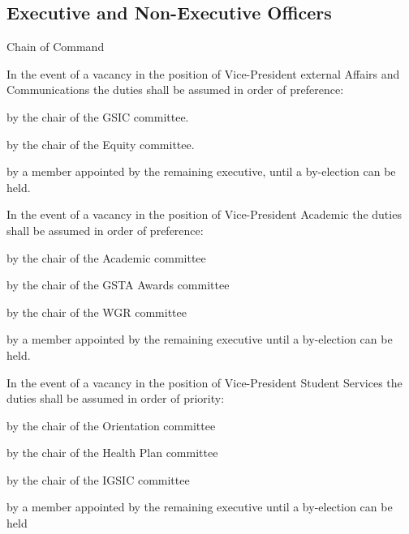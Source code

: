 \subsection{Executive and Non-Executive Officers}

\begin{longenum}[ label*=\thesubsection.\arabic*., align=left]
	\item Chain of Command
		\begin{longenum}[ label*=\arabic*., align=left]
			\item In the event of a vacancy in the position of Vice-President external Affairs and Communications the duties shall be assumed in order of preference:
			\begin{longenum}[ label*=\arabic*., align=left]
				\item by the chair of the GSIC committee.
				\item by the chair of the Equity committee.
				\item by a member appointed by the remaining executive, until a by-election can be held.
			\end{longenum}
			\item In the event of a vacancy in the position of Vice-President Academic the duties shall be assumed in order of preference:
			\begin{longenum}[ label*=\arabic*., align=left]
				\item by the chair of the Academic committee
				\item by the chair of the GSTA Awards committee
				\item by the chair of the WGR committee
				\item by a member appointed by the remaining executive until a by-election can be held.
			\end{longenum}
			\item In the event of a vacancy in the position of Vice-President Student Services the duties shall be assumed in order of priority: 
			\begin{longenum}[ label*=\arabic*., align=left]
				\item by the chair of the Orientation committee
				\item by the chair of the Health Plan committee
				\item by the chair of the IGSIC committee
				\item by a member appointed by the remaining executive until a by-election can be held
			\end{longenum}

\end{longenum}
\end{longenum}
